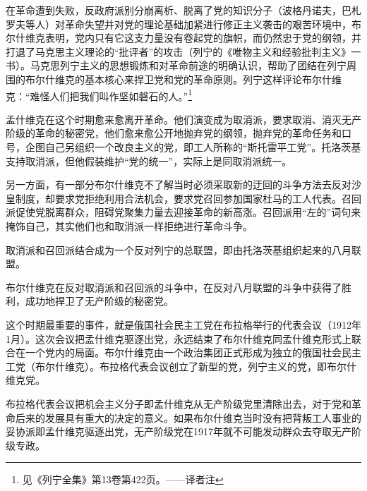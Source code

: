 在革命遭到失败，反政府派别分崩离析、脱离了党的知识分子（波格丹诺夫，巴札罗夫等人）对革命失望并对党的理论基础加紧进行修正主义袭击的艰苦环境中，布尔什维克表明，党内只有它这支力量没有卷起党的旗帜，而仍然忠于党的纲领，并打退了马克思主义理论的“批评者”的攻击（列宁的《唯物主义和经验批判主义》一书）。马克思列宁主义的思想锻炼和对革命前途的明确认识，帮助了团结在列宁周围的布尔什维克的基本核心来捍卫党和党的革命原则。列宁这样评论布尔什维克：“难怪人们把我们叫作坚如磐石的人。”\footnote{见《列宁全集》第13卷第422页。——译者注}

孟什维克在这个时期愈来愈离开革命。他们演变成为取消派，要求取消、消灭无产阶级的革命的秘密党，他们愈来愈公开地抛弃党的纲领，抛弃党的革命任务和口号，企图自己另组织一个改良主义的党，即工人所称的“斯托雷平工党”。托洛茨基支持取消派，但他假装维护“党的统一”，实际上是同取消派统一。

另一方面，有一部分布尔什维克不了解当时必须采取新的迂回的斗争方法去反对沙皇制度，却要求党拒绝利用合法机会，要求党召回参加国家杜马的工人代表。召回派促使党脱离群众，阻碍党聚集力量去迎接革命的新高涨。召回派用“左的”词句来掩饰自己，其实他们也和取消派一样拒绝进行革命斗争。

取消派和召回派结合成为一个反对列宁的总联盟，即由托洛茨基组织起来的八月联盟。

布尔什维克在反对取消派和召回派的斗争中，在反对八月联盟的斗争中获得了胜利，成功地捍卫了无产阶级的秘密党。

这个时期最重要的事件，就是俄国社会民主工党在布拉格举行的代表会议（1912年1月）。这次会议把孟什维克驱逐出党，永远结束了布尔什维克同孟什维克形式上联合在一个党内的局面。布尔什维克由一个政治集团正式形成为独立的俄国社会民主工党（布尔什维克）。布拉格代表会议创立了新型的党，列宁主义的党，即布尔什维克党。

布拉格代表会议把机会主义分子即孟什维克从无产阶级党里清除出去，对于党和革命后来的发展具有重大的决定的意义。如果布尔什维克当时没有把背叛工人事业的妥协派即孟什维克驱逐出党，无产阶级党在1917年就不可能发动群众去夺取无产阶级专政。

